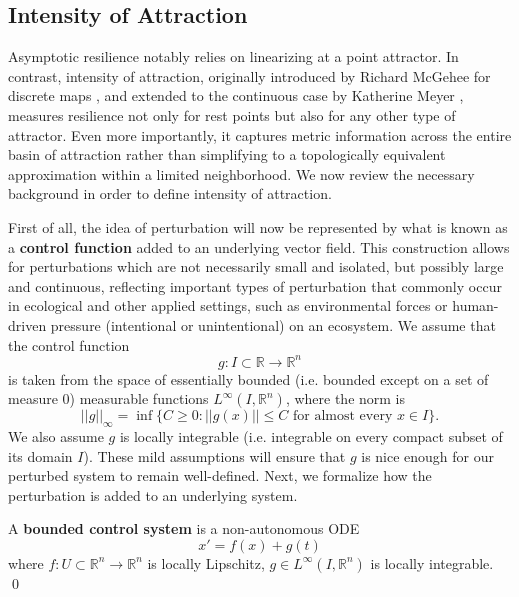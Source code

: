 \subsection{Intensity of Attraction}

Asymptotic resilience notably relies on linearizing at a point attractor. In contrast, intensity of attraction, originally introduced by Richard McGehee for discrete maps \cite{mcgeheeMetricPropertiesAttractors1988}, and extended to the continuous case by Katherine Meyer \cite{meyerMetricPropertiesAttractors2019}, measures resilience not only for rest points but also for any other type of attractor. Even more importantly, it captures metric information across the entire basin of attraction rather than simplifying to a topologically equivalent approximation within a limited neighborhood. We now review the necessary background in order to define intensity of attraction. 

First of all, the idea of perturbation will now be represented by what is known as a \textbf{control function} added to an underlying vector field. This construction allows for perturbations which are not necessarily small and isolated, but possibly large and continuous, reflecting important types of perturbation that commonly occur in ecological and other applied settings, such as environmental forces or human-driven pressure (intentional or unintentional) on an ecosystem. We assume that the control function $$g: I \subset \mathbb{R} \to \mathbb{R}^n$$ is taken from the space of essentially bounded (i.e. bounded except on a set of measure 0) measurable functions $L^\infty (I,\mathbb{R}^n)$, where the norm is 
$$||g||_\infty = \inf\{C \geq 0  :  ||g(x)|| \leq C  \text{ for almost every } x \in I \}.$$ 
We also assume $g$ is locally integrable (i.e. integrable on every compact subset of its domain $I$). These mild assumptions will ensure that $g$ is nice enough for our perturbed system to remain well-defined. Next, we formalize how the perturbation is added to an underlying system. 

\begin{definition}
	A \textbf{bounded control system}  is a non-autonomous ODE 
	\begin{equation}
		\label{eqn:control_ode}x' = f(x) + g(t)
	\end{equation}
	where $f: U \subset \mathbb{R}^n \to \mathbb{R}^n$ is locally Lipschitz, $g \in L^\infty (I,\mathbb{R}^n)$ is locally integrable. \qed
\end{definition}

